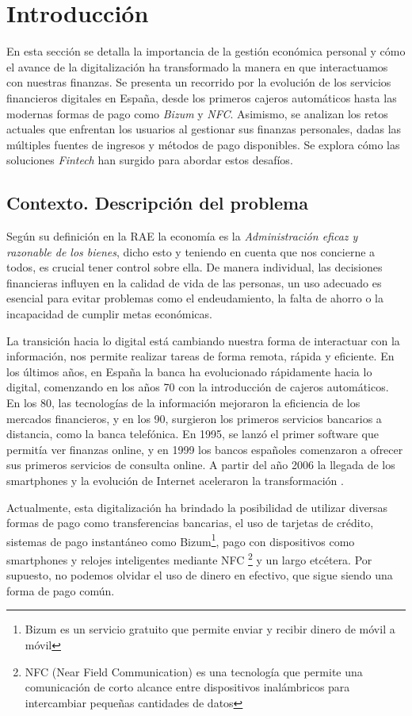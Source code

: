 \chapter{Introducción}
En esta sección se detalla la importancia de la gestión económica personal y cómo el avance de la digitalización ha transformado la manera en que interactuamos con nuestras finanzas. Se presenta un recorrido por la evolución de los servicios financieros digitales en España, desde los primeros cajeros automáticos hasta las modernas formas de pago como \textit{Bizum} y \textit{NFC}. Asimismo, se analizan los retos actuales que enfrentan los usuarios al gestionar sus finanzas personales, dadas las múltiples fuentes de ingresos y métodos de pago disponibles. Se explora cómo las soluciones \textit{Fintech} han surgido para abordar estos desafíos.

\section{Contexto. Descripción del problema} 
Según su definición en la RAE\cite{rae_economia} la economía es la 
\textit{Administración eficaz y razonable de los bienes}, dicho esto y teniendo en 
cuenta que nos concierne a todos, es crucial tener control sobre ella. 
De manera individual, las decisiones financieras influyen en la calidad de vida de las personas,
un uso adecuado es esencial para evitar problemas como el endeudamiento, la 
falta de ahorro o la incapacidad de cumplir metas económicas.

La transición hacia lo digital está cambiando nuestra forma de interactuar con la información, nos permite realizar tareas de forma remota, rápida y eficiente. 
En los últimos años, en España la banca ha evolucionado rápidamente hacia lo digital, comenzando en los años 70 con la introducción de cajeros automáticos. En los 80, las tecnologías de la información mejoraron la eficiencia de los mercados financieros, y en los 90, surgieron los primeros servicios bancarios a distancia, como la banca telefónica. En 1995, se lanzó el primer software que permitía ver finanzas online, y en 1999 los bancos españoles comenzaron a ofrecer sus primeros servicios de consulta online. A partir del año 2006 la llegada de los smartphones y la evolución de Internet aceleraron la transformación \cite{hebrero2022fintech}.

Actualmente, esta digitalización ha brindado la posibilidad de utilizar diversas formas de pago como transferencias bancarias, el uso de tarjetas de crédito, sistemas de pago instantáneo como Bizum\footnote{Bizum es un servicio gratuito que permite enviar y recibir dinero de móvil a móvil}, pago con dispositivos como smartphones y relojes inteligentes mediante NFC \footnote{NFC (Near Field Communication) es una tecnología que permite una comunicación de corto alcance entre dispositivos inalámbricos para intercambiar pequeñas cantidades de datos} y un largo etcétera. Por supuesto, no podemos olvidar el uso de dinero en efectivo, que sigue siendo una forma de pago común. 

